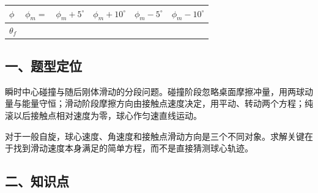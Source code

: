 \documentclass[12pt,a4paper,fontset=fandol]{ctexart}
\begin{document}
{\def\LTcaptype{table} %
\begin{longtable}[]{@{}
  >{\raggedright\arraybackslash}p{}
  >{\raggedright\arraybackslash}p{}
  >{\raggedright\arraybackslash}p{}
  >{\raggedright\arraybackslash}p{}
  >{\raggedright\arraybackslash}p{}
  >{\raggedright\arraybackslash}p{}@{}}
\toprule\noalign{}
\begin{minipage}[b]{\linewidth}\raggedright
\(\phi\)
\end{minipage} & \begin{minipage}[b]{\linewidth}\raggedright
\(\phi_m=\)
\end{minipage} & \begin{minipage}[b]{\linewidth}\raggedright
\(\phi_m+5^\circ\)
\end{minipage} & \begin{minipage}[b]{\linewidth}\raggedright
\(\phi_m+10^\circ\)
\end{minipage} & \begin{minipage}[b]{\linewidth}\raggedright
\(\phi_m-5^\circ\)
\end{minipage} & \begin{minipage}[b]{\linewidth}\raggedright
\(\phi_m-10^\circ\)
\end{minipage} \\
\midrule\noalign{}
\endhead
\bottomrule\noalign{}
\endlastfoot
\(\theta_f\) & & & & & \\
\end{longtable}
}

\subsection{一、题型定位}\label{ux4e00ux9898ux578bux5b9aux4f4d-1}

瞬时中心碰撞与随后刚体滑动的分段问题。碰撞阶段忽略桌面摩擦冲量，用两球动量与能量守恒；滑动阶段摩擦方向由接触点速度决定，用平动、转动两个方程；纯滚以后接触点相对速度为零，球心作匀速直线运动。

对于一般自旋，球心速度、角速度和接触点滑动方向是三个不同对象。求解关键在于找到滑动速度本身满足的简单方程，而不是直接猜测球心轨迹。

\subsection{二、知识点}\label{ux4e8cux77e5ux8bc6ux70b9-1}
\end{document}
